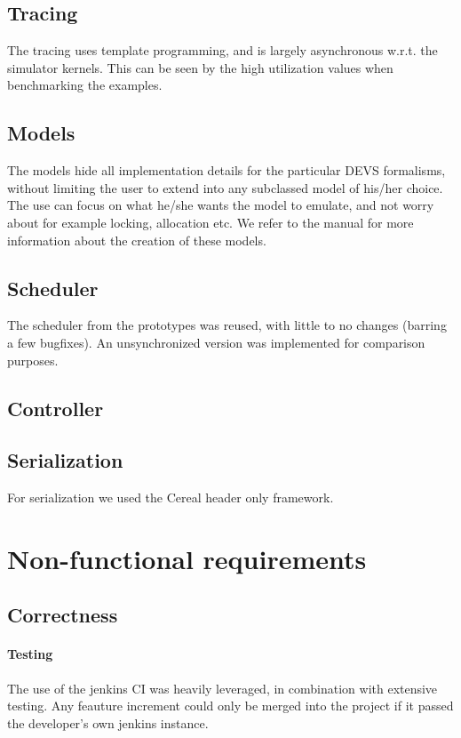 \documentclass[8pt,a4paper]{report}
\begin{document}
\section{Tracing}
The tracing uses template programming, and is largely asynchronous w.r.t. the simulator kernels. This can be seen by the high utilization values when benchmarking the examples.

\section{Models}
The models hide all implementation details for the particular DEVS formalisms, without limiting the user to extend into any subclassed model of his/her choice. The use can focus on what he/she wants the model to emulate, and not worry about for example locking, allocation etc. We refer to the manual for more information about the creation of these models.

\section{Scheduler}
The scheduler from the prototypes was reused, with little to no changes (barring a few bugfixes). An unsynchronized version was implemented for comparison purposes.

\section{Controller}

\section{Serialization}
For serialization we used the Cereal \cite{cereal} header only framework.

\chapter{Non-functional requirements}
\section{Correctness}
\subsubsection{Testing}
The use of the jenkins CI was heavily leveraged, in combination with extensive testing. Any feauture increment could only be merged into the project if it passed the developer's own jenkins instance.
\end{document}
